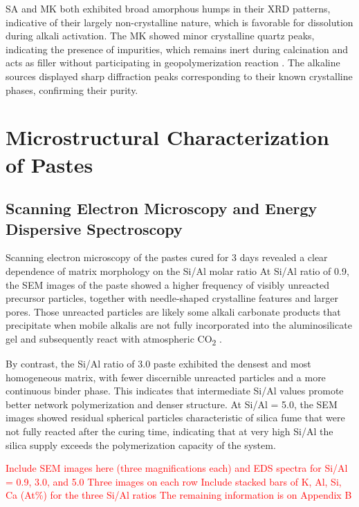 SA and MK both exhibited broad amorphous humps in their XRD patterns, indicative of their largely non-crystalline nature, which is favorable for dissolution during alkali activation.
The MK showed minor crystalline quartz peaks, indicating the presence of impurities, which remains inert during calcination \cite{provis2014geopolymers} and acts as filler without participating in geopolymerization reaction \cite{rakhimova2019metakaolin}.
The alkaline sources displayed sharp diffraction peaks corresponding to their known crystalline phases, confirming their purity.

\section{Microstructural Characterization of Pastes}

\subsection{Scanning Electron Microscopy and Energy Dispersive Spectroscopy}

Scanning electron microscopy of the pastes cured for 3 days revealed a clear dependence of matrix morphology on the Si/Al molar ratio
At Si/Al ratio of 0.9, the SEM images of the paste showed a higher frequency of visibly unreacted precursor particles, together with needle-shaped crystalline features and larger pores. Those unreacted particles are likely some alkali carbonate products that precipitate when mobile alkalis are not fully incorporated into the aluminosilicate gel and subsequently react with atmospheric CO\textsubscript{2} \cite{provis2018alkali}.

By contrast, the Si/Al ratio of 3.0 paste exhibited the densest and most homogeneous matrix, with fewer discernible unreacted particles and a more continuous binder phase.
This indicates that intermediate Si/Al values promote better network polymerization and denser structure.
At Si/Al = 5.0, the SEM images showed residual spherical particles characteristic of silica fume that were not fully reacted after the curing time, indicating that at very high Si/Al the silica supply exceeds the polymerization capacity of the system.

\textcolor{red}{Include SEM images here (three magnifications each) and EDS spectra for Si/Al = 0.9, 3.0, and 5.0}
\textcolor{red}{Three images on each row}
\textcolor{red}{Include stacked bars of K, Al, Si, Ca (At\%) for the three Si/Al ratios }
\textcolor{red}{The remaining information is on Appendix B}



